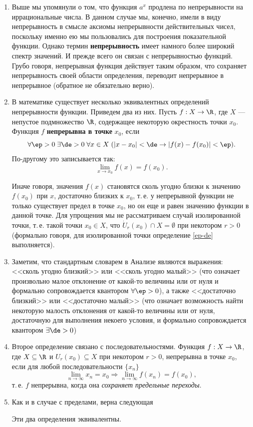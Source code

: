 \begin{enumerate}
\item Выше мы упомянули о том, что функция $a^x$ продлена по непрерывности на иррациональные числа. В данном случае мы, конечно, имели в виду непрерывность в смысле аксиомы непрерывности действительных чисел, поскольку именно ею мы пользовались для построения показательной функции. Однако термин \textbf{непрерывность} имеет намного более широкий спектр значений. И прежде всего он связан с непрерывностью функций. Грубо говоря, непрерывная функция действует таким образом, что сохраняет непрерывность своей области определения, переводит непрерывное в непрерывное (обратное не обязательно верно).

\item В математике существует несколько эквивалентных определений непрерывности функции. Приведем два из них. Пусть $f:X\to\R$, где $X$ --- непустое подмножество $\R$, содержащее некоторую окрестность точки $x_0$. Функция $f$ \textbf{непрерывна в точке} $x_0$, если
\begin{equation}\label{ep-de}
\forall\ep>0 \; \exists\de>0\;\forall x\in X\;(|x-x_0|<\de\to |f(x)-f(x_0)|<\ep).
\end{equation}
По-другому это записывается так:
$$
\lim_{x\to x_0}f(x)=f(x_0).
$$

Иначе говоря, значения $f(x)$ становятся сколь угодно близки к значению $f(x_0)$ при $x$, достаточно близких к $x_0$, т.\,е. у непрерывной функции не только существует предел в точке $x_0$, но он еще и равен значению функции в данной точке. Для упрощения мы не рассматриваем случай изолированной точки, т.\,е. такой точки $x_0\in X$, что $\dot U_r(x_0)\cap X=\emptyset$ при некотором $r>0$ (формально говоря, для изолированной точки определение \eqref{ep-de} выполняется).

\item Заметим, что стандартным словарем в Анализе являются выражения: <<сколь угодно близкий>> или <<сколь угодно малый>> (что означает произвольно малое отклонение от какой-то величины или от нуля и формально сопровождается квантором $\forall\ep>0$), а также <<достаточно близкий>> или <<достаточно малый>> (что означает возможность найти некоторую малость отклонения от какой-то величины или от нуля, достаточную для выполнения некоего условия, и формально сопровождается квантором $\exists\de>0$)

\item Второе определение связано с последовательностями. Функция $f:X\to\R$, где $X\subseteq\R$ и $U_r(x_0)\subseteq X$ при некотором $r>0$, непрерывна в точке $x_0$, если для любой последовательности $\{x_n\}$ 
\begin{equation}\label{seq}
\lim_{n\to\infty}x_n=x_0\Rightarrow \lim_{n\to\infty}f(x_n)=f(x_0),
\end{equation}
т.\,е. $f$ непрерывна, когда она \textit{сохраняет предельные переходы}.
\item Как и в случае с пределами, верна следующая
\begin{thrm}Эти два определения эквивалентны.\end{thrm}


\end{enumerate}
